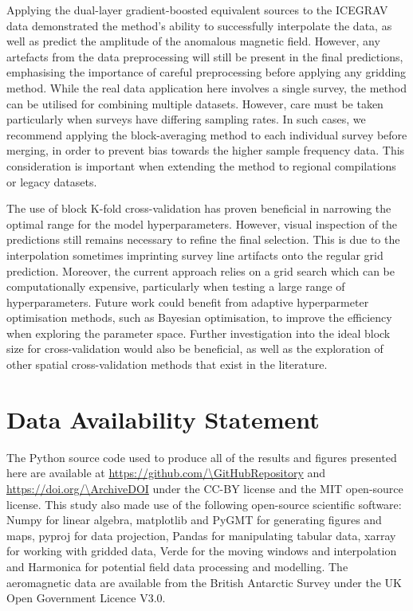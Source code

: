 Applying the dual-layer gradient-boosted equivalent sources to the ICEGRAV data demonstrated the method’s ability to successfully interpolate the data, as well as predict the amplitude of the anomalous magnetic field. However, any artefacts from the data preprocessing will still be present in the final predictions, emphasising the importance of careful preprocessing before applying any gridding method. While the real data application here involves a single survey, the method can be utilised for combining multiple datasets. However, care must be taken particularly when surveys have differing sampling rates. In such cases, we recommend applying the block-averaging method to each individual survey before merging, in order to prevent bias towards the higher sample frequency data. This consideration is important when extending the method to regional compilations or legacy datasets.

The use of block K-fold cross-validation has proven beneficial in narrowing the optimal range for the model hyperparameters. However, visual inspection of the predictions still remains necessary to refine the final selection. This is due to the interpolation sometimes imprinting survey line artifacts onto the regular grid prediction. Moreover, the current approach relies on a grid search which can be computationally expensive, particularly when testing a large range of hyperparameters. Future work could benefit from adaptive hyperparmeter optimisation methods, such as Bayesian optimisation, to improve the efficiency when exploring the parameter space. Further investigation into the ideal block size for cross-validation would also be beneficial, as well as the exploration of other spatial cross-validation methods that exist in the literature.



\section{Data Availability Statement}

The Python source code used to produce all of the results and figures presented here are available at \url{https://github.com/\GitHubRepository} and
\url{https://doi.org/\ArchiveDOI} under the CC-BY license and the MIT open-source license. This study also made use of the following open-source scientific software: Numpy \citep{numpy} for linear algebra, matplotlib \citep{matplotlib} and PyGMT \citep{pygmt} for generating figures and maps, pyproj \citep{pyproj} for data projection, Pandas \citep{pandas} for manipulating tabular data, xarray \citep{xarray} for working with gridded data, Verde \citep{verde} for the moving windows and interpolation and Harmonica \citep{harmonica} for potential field data processing and modelling. The aeromagnetic data are available from the British Antarctic Survey \citep{ICEGRAV_data} under the UK Open Government Licence V3.0.

